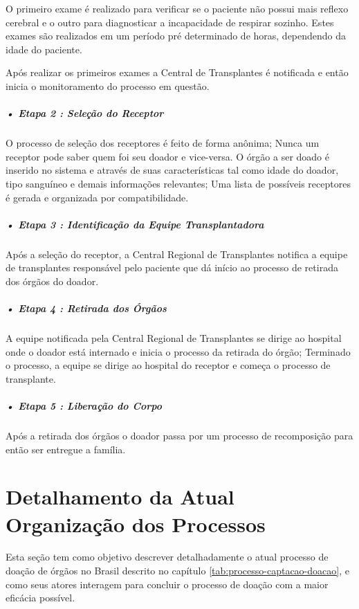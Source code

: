 \documentclass[portuguese,oneside]{tcc}
\begin{document}
O primeiro exame é realizado para verificar se o paciente não possui mais reflexo cerebral e o outro para diagnosticar a incapacidade de respirar sozinho. Estes exames são realizados em um período pré determinado de horas, dependendo da idade do paciente. 

Após realizar os primeiros exames a Central de Transplantes é notificada e então inicia o monitoramento do processo em questão.

\subparagraph{• Etapa 2 : Seleção do Receptor}
O processo de seleção dos receptores é feito de forma anônima; Nunca um receptor pode saber quem foi seu doador e vice-versa. O órgão a ser doado é inserido no sistema e através de suas características tal como idade do doador, tipo sanguíneo e demais informações relevantes; Uma lista de possíveis receptores é gerada e organizada por compatibilidade.

\subparagraph{• Etapa 3 : Identificação da Equipe Transplantadora}
Após a seleção do receptor, a Central Regional de Transplantes notifica a equipe de transplantes responsável pelo paciente que dá início ao processo de retirada dos órgãos do doador.

\subparagraph{• Etapa 4 : Retirada dos Órgãos}
A equipe notificada pela Central Regional de Transplantes se dirige ao hospital onde o doador está internado e inicia o processo da retirada do órgão; Terminado o processo, a equipe se dirige ao hospital do receptor e começa o processo de transplante.

\subparagraph{• Etapa 5 : Liberação do Corpo}
Após a retirada dos órgãos o doador passa por um processo de recomposição para então ser entregue a família.


\section{Detalhamento da Atual Organização dos Processos}  \label{tab:detalhamento-atual}
Esta seção tem como objetivo descrever detalhadamente o atual processo de doação de órgãos no Brasil descrito no capítulo \ref{tab:processo-captacao-doacao}, e como seus atores interagem para concluir o processo de doação com a maior eficácia possível.
\end{document}
